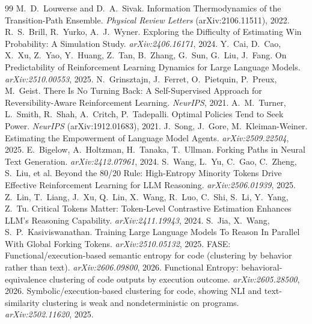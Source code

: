 \documentclass[11pt]{article}
\begin{document}
\begin{thebibliography}{99}
 M.~D.~Louwerse and D.~A.~Sivak. Information Thermodynamics of the Transition-Path Ensemble. \emph{Physical Review Letters} (arXiv:2106.11511), 2022.
 R.~S.~Brill, R.~Yurko, A.~J.~Wyner. Exploring the Difficulty of Estimating Win Probability: A Simulation Study. \emph{arXiv:2406.16171}, 2024.
 Y.~Cai, D.~Cao, X.~Xu, Z.~Yao, Y.~Huang, Z.~Tan, B.~Zhang, G.~Sun, G.~Liu, J.~Fang. On Predictability of Reinforcement Learning Dynamics for Large Language Models. \emph{arXiv:2510.00553}, 2025.
 N.~Grinsztajn, J.~Ferret, O.~Pietquin, P.~Preux, M.~Geist. There Is No Turning Back: A Self-Supervised Approach for Reversibility-Aware Reinforcement Learning. \emph{NeurIPS}, 2021.
 A.~M.~Turner, L.~Smith, R.~Shah, A.~Critch, P.~Tadepalli. Optimal Policies Tend to Seek Power. \emph{NeurIPS} (arXiv:1912.01683), 2021.
 J.~Song, J.~Gore, M.~Kleiman-Weiner. Estimating the Empowerment of Language Model Agents. \emph{arXiv:2509.22504}, 2025.
 E.~Bigelow, A.~Holtzman, H.~Tanaka, T.~Ullman. Forking Paths in Neural Text Generation. \emph{arXiv:2412.07961}, 2024.
 S.~Wang, L.~Yu, C.~Gao, C.~Zheng, S.~Liu, et al. Beyond the 80/20 Rule: High-Entropy Minority Tokens Drive Effective Reinforcement Learning for LLM Reasoning. \emph{arXiv:2506.01939}, 2025.
 Z.~Lin, T.~Liang, J.~Xu, Q.~Lin, X.~Wang, R.~Luo, C.~Shi, S.~Li, Y.~Yang, Z.~Tu. Critical Tokens Matter: Token-Level Contrastive Estimation Enhances LLM's Reasoning Capability. \emph{arXiv:2411.19943}, 2024.
 S.~Jia, X.~Wang, S.~P.~Kasiviswanathan. Training Large Language Models To Reason In Parallel With Global Forking Tokens. \emph{arXiv:2510.05132}, 2025.
 FASE: Functional/execution-based semantic entropy for code (clustering by behavior rather than text). \emph{arXiv:2606.09800}, 2026.
 Functional Entropy: behavioral-equivalence clustering of code outputs by execution outcome. \emph{arXiv:2605.28500}, 2026.
 Symbolic/execution-based clustering for code, showing NLI and text-similarity clustering is weak and nondeterministic on programs. \emph{arXiv:2502.11620}, 2025.
\end{thebibliography}
\end{document}
